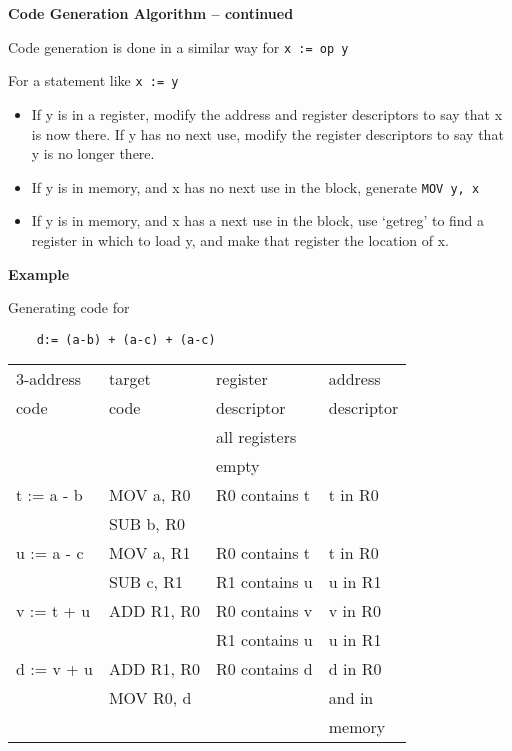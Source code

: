 %
%
\begin{slide}{}
{\small
{\bf Code Generation Algorithm -- continued}

Code generation is done in a similar way for {\tt x := op y}

For a statement like {\tt x := y}
\begin{itemize}
\item  If y is in a register, modify the
  address and register descriptors to say
  that x is now there.  If y has no next
  use, modify the register descriptors to
  say that y is no longer there.

\item  If y is in memory, and x has no next use
  in the block, generate {\tt MOV y, x}

\item  If y is in memory, and x has a next use
  in the block, use `getreg' to find a
  register in which to load y, and make
  that register the location of x.
\end{itemize}
}
\end{slide}
%
%
\begin{slide}{}
{\bf Example}

Generating code for
\begin{verbatim}
    d:= (a-b) + (a-c) + (a-c)
\end{verbatim}

{\small
\begin{tabular}{|l|l|l|l|}
\hline
3-address & target & register   & address\\
code      & code   & descriptor & descriptor\\
\hline
           &            & all registers & \\
           &            &     empty & \\
\cline{3-4}
t := a - b & MOV a, R0  & R0 contains t & t in R0\\
           & SUB b, R0  &               & \\
\cline{3-4}
u := a - c & MOV a, R1  & R0 contains t & t in R0\\
           & SUB c, R1  & R1 contains u & u in R1\\
\cline{3-4}
v := t + u & ADD R1, R0 & R0 contains v & v in R0\\
           &            & R1 contains u & u in R1\\
\cline{3-4}
d := v + u & ADD R1, R0 & R0 contains d & d in R0\\
           & MOV R0, d  &               & and in \\
           &            &               & memory\\
\hline
\end{tabular}
}
\end{slide}
